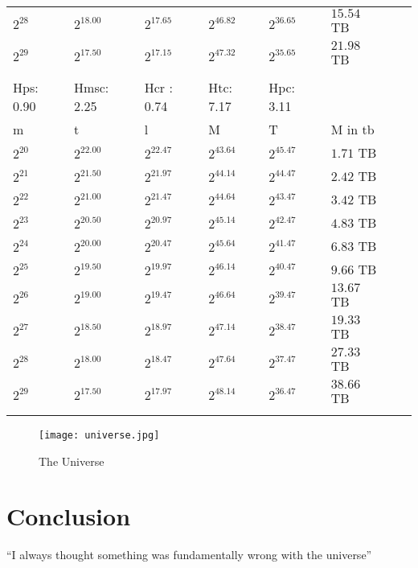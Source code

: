 \documentclass{article}
\begin{document}
\begin{tabular}{llllllll}
$2^{28}$ & $2^{18.00}$ & $2^{17.65}$ & $2^{46.82}$ & $2^{36.65}$ & $15.54$ TB \\
$2^{29}$ & $2^{17.50}$ & $2^{17.15}$ & $2^{47.32}$ & $2^{35.65}$ & $21.98$ TB \\
 &  &  &  &  &  \\
Hps: 0.90 & Hmsc: 2.25 & Hcr : 0.74 & Htc: 7.17 & Hpc: 3.11 &  \\
m & t & l & M & T & M in tb \\
$2^{20}$ & $2^{22.00}$ & $2^{22.47}$ & $2^{43.64}$ & $2^{45.47}$ & $1.71$ TB \\
$2^{21}$ & $2^{21.50}$ & $2^{21.97}$ & $2^{44.14}$ & $2^{44.47}$ & $2.42$ TB \\
$2^{22}$ & $2^{21.00}$ & $2^{21.47}$ & $2^{44.64}$ & $2^{43.47}$ & $3.42$ TB \\
$2^{23}$ & $2^{20.50}$ & $2^{20.97}$ & $2^{45.14}$ & $2^{42.47}$ & $4.83$ TB \\
$2^{24}$ & $2^{20.00}$ & $2^{20.47}$ & $2^{45.64}$ & $2^{41.47}$ & $6.83$ TB \\
$2^{25}$ & $2^{19.50}$ & $2^{19.97}$ & $2^{46.14}$ & $2^{40.47}$ & $9.66$ TB \\
$2^{26}$ & $2^{19.00}$ & $2^{19.47}$ & $2^{46.64}$ & $2^{39.47}$ & $13.67$ TB \\
$2^{27}$ & $2^{18.50}$ & $2^{18.97}$ & $2^{47.14}$ & $2^{38.47}$ & $19.33$ TB \\
$2^{28}$ & $2^{18.00}$ & $2^{18.47}$ & $2^{47.64}$ & $2^{37.47}$ & $27.33$ TB \\
$2^{29}$ & $2^{17.50}$ & $2^{17.97}$ & $2^{48.14}$ & $2^{36.47}$ & $38.66$ TB \\
 &  &  &  &  &  \\
\end{tabular}
\begin{figure}[h!]
\centering
\texttt{[image: universe.jpg]}
\caption{The Universe}
\label{fig:univerise}
\end{figure}

\section{Conclusion}
``I always thought something was fundamentally wrong with the universe'' \citep{adams1995hitchhiker}




\end{document}
